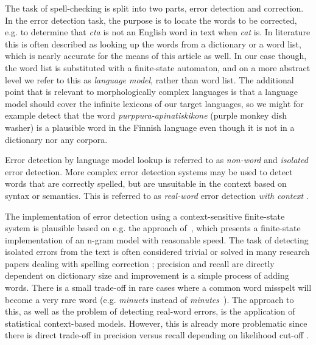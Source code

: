 \documentclass[a4paper,12pt]{article}
\begin{document}
The task of spell-checking is split into two parts, error detection and
correction. In the error detection task, the purpose is to locate the words to
be corrected, e.g. to determine that \emph{cta} is not an English word in text
when \emph{cat} is. In literature this is often described as looking up the
words from a dictionary or a word list, which is nearly accurate for the means
of this article as well. In our case though, the word list is substituted with
a finite-state automaton, and on a more abstract level we refer to this as
\emph{language model}, rather than word list. The additional point that is
relevant to morphologically complex languages is that a language model should
cover the infinite lexicons of our target languages, so we might for
example detect that the word \emph{purppura-apinatiskikone} (purple monkey dish
washer) is a plausible word in the Finnish language even though it is not in a
dictionary nor any corpora.

Error detection by language model lookup is referred to as \emph{non-word} and
\emph{isolated} error detection. More complex error detection systems may be
used to detect words that are correctly spelled, but are unsuitable in the
context based on syntax or semantics. This is referred to as \emph{real-word}
error detection \emph{with context} \cite{mays/1991}.

The implementation of error detection using a context-sensitive finite-state
system is plausible based on e.g. the approach of~\cite{silfverberg/2010},
which presents a finite-state implementation of an n-gram model with reasonable
speed. The task of detecting isolated errors from the text is often considered
trivial or solved in many research papers dealing with spelling correction
\cite[e.g.][]{otero/2007}; precision and recall are directly dependent on
dictionary size and improvement is a simple process of adding words.  There is
a small trade-off in rare cases where a common word misspelt will become a very
rare word (e.g. \emph{minuets} instead of
\emph{minutes}~\cite{kukich1992techniques}). The approach to this, as well as
the problem of detecting real-word errors, is the application of statistical
context-based models.  However, this is already more problematic since there is
direct trade-off in precision versus recall depending on likelihood cut-off
\cite[]{hirst2008evaluation,wilcoxohearn2008realword}.
\end{document}

